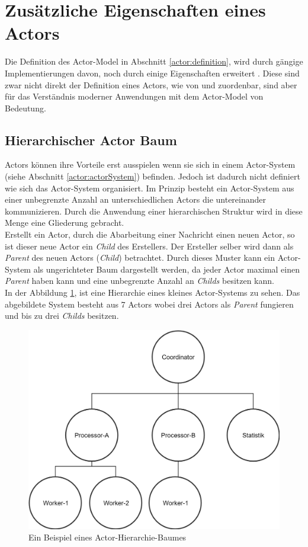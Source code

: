 \section{Zusätzliche Eigenschaften eines Actors}
Die Definition des Actor-Model in Abschnitt \ref{actor:definition}, wird durch gängige Implementierungen davon, noch durch einige Eigenschaften erweitert \citep{Vernon2015ReactiveAkka}. Diese sind zwar nicht direkt der Definition eines Actors, wie von \cite{Hewitt1973AIntelligence} und \cite{Agha1985ActorsSystems} zuordenbar, sind aber für das Verständnis moderner Anwendungen mit dem Actor-Model von Bedeutung.
\subsection{Hierarchischer Actor Baum}
Actors können ihre Vorteile erst ausspielen wenn sie sich in einem Actor-System (siehe Abschnitt \ref{actor:actorSystem}) befinden. Jedoch ist dadurch nicht definiert wie sich das Actor-System organisiert. Im Prinzip besteht ein Actor-System aus einer unbegrenzte Anzahl an unterschiedlichen Actors die untereinander kommunizieren. Durch die Anwendung einer hierarchischen Struktur wird in diese Menge eine Gliederung gebracht. \\
Erstellt ein Actor, durch die Abarbeitung einer Nachricht einen neuen Actor, so ist dieser neue Actor ein \textit{Child} des Erstellers. Der Ersteller selber wird dann als \textit{Parent} des neuen Actors (\textit{Child}) betrachtet. Durch dieses Muster kann ein Actor-System als ungerichteter Baum dargestellt werden, da jeder Actor maximal einen \textit{Parent} haben kann und eine unbegrenzte Anzahl an \textit{Childs} besitzen kann. \\
In der Abbildung \ref{fig:actor:actorHierarchySample}, ist eine Hierarchie eines kleines Actor-Systems zu sehen. Das abgebildete System besteht aus 7 Actors wobei drei Actors als \textit{Parent} fungieren und bis zu drei \textit{Childs} besitzen. 
\begin{figure}
    \centering
    \includegraphics[width=0.6\linewidth]{gfx/actor/actorHierarchy}
    \caption{Ein Beispiel eines Actor-Hierarchie-Baumes}
    \label{fig:actor:actorHierarchySample}
\end{figure}

